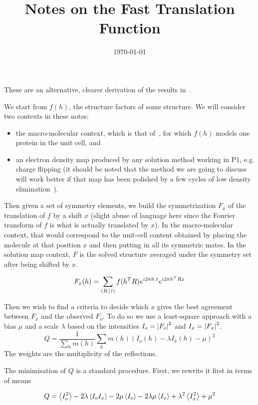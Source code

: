 \documentclass[11pt]{article}
\title{Notes on the Fast Translation Function}
\author{\lucjbourhis}
\date{\today}
\begin{document}
\maketitle

These are an alternative, clearer derivation of the results in~\cite{J.Navaza:1995}.

We start from $f(h)$, the structure factors of some structure. We will consider two contexts in these notes:
\begin{itemize}
\item the macro-molecular context, which is that of~\cite{J.Navaza:1995}, for which $f(h)$ models one protein in the unit cell, and
\item an electron density map produced by any solution method working in P1, e.g. charge flipping (it should be noted that the method we are going to discuss will work better if that map has been polished by a few cycles of low density elimination~\cite{Shiono:1992}).
\end{itemize}

Then given a set of symmetry elements, we build the symmetrization $F_x$ of the translation of $f$ by a shift $x$ (slight abuse of language here since the Fourier transform of $f$ is what is actually translated by $x$). In the macro-molecular context, that would correspond to the unit-cell content obtained by placing the molecule at that position $x$ and then putting in all its symmetric mates. In the solution map context, $F$ is the solved structure averaged under the symmetry set after being shifted by $x$.

\begin{equation}
F_x(h) = \sum_{\left( R\,\vert\, t \right)} f(h^T R) e^{i2\pi h.t} e^{i2\pi h^T R x}
\end{equation}

Then we wish to find a criteria to decide which $x$ gives the best agreement between $F_x$ and the observed $F_o$. To do so we use a least-square approach with a bias $\mu$ and a scale $\lambda$ based on the intensities $I_o = \left| F_o \right|^2$ and $I_x = \left| F_x \right|^2$.
\begin{equation}
Q = \frac{1}{\sum_h m(h)} \sum_h m(h) \left(I_o(h) - \lambda I_x(h) - \mu\right)^2
\end{equation}
The weights are the multiplicity of the reflections.

The minimisation of $Q$ is a standard procedure. First, we rewrite it first in terms of means

\begin{equation*}
Q = \left\langle I_o^2 \right\rangle -2\lambda\left\langle I_o I_x \right\rangle -2\mu\left\langle I_o \right\rangle -2\lambda\mu\left\langle I_x \right\rangle + \lambda^2\left\langle I_x^2 \right\rangle + \mu^2
\end{equation*}
\end{document}
